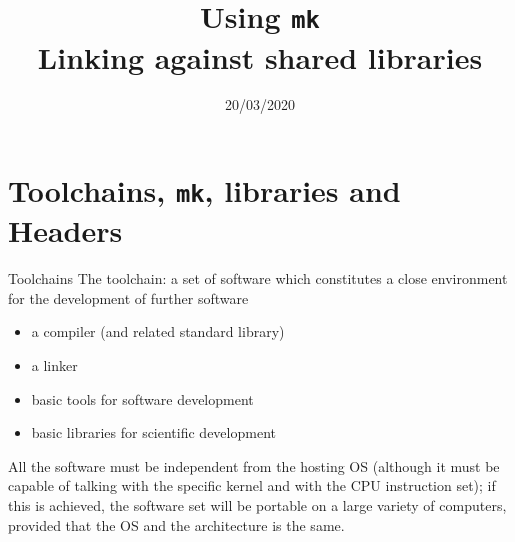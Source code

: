 \documentclass[10pt]{beamer}
\begin{document}
    \title{Using \texttt{mk}\\
        Linking against shared libraries}
    \date{20/03/2020}
    
    \begin{frame}
    \maketitle
\end{frame}

\section{Toolchains, \texttt{mk}, libraries and Headers}

\begin{frame}{Toolchains}
The toolchain: a set of software which constitutes a close environment for the development of further software

\begin{itemize}
    \item a compiler (and related standard library)
    \item a linker
    \item basic tools for software development
    \item basic libraries for scientific development
\end{itemize}	

All the software must be independent from the hosting OS 
(although it must be capable of talking with the specific kernel and with the CPU instruction set); if this is achieved, the software set will be portable on a large variety of computers, provided that the OS and the architecture is the same.

\end{frame}
\end{document}
